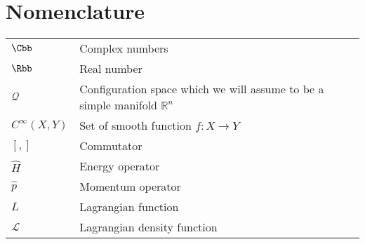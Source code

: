 \chapter*{Nomenclature}

\begin{flushleft}
\begin{longtable}[l]{ll}
    $\Cbb$ & Complex numbers \\[1mm]
    $\Rbb$ & Real number \\[1mm]
    $\mathcal{Q}$ & Configuration space which we will assume to be a simple manifold $\mathbb{R}^{n}$ \\[1mm]
    $C^{\infty}(X, Y)$ & Set of smooth function $f: X \to Y$ \\[1mm]
    $[,]$ & Commutator \\[1mm]
    $\hat{H}$ & Energy operator \\[1mm]
    $\hat{p}$ & Momentum operator \\[1mm]
    $L$ & Lagrangian function \\[1mm]
    $\mathcal{L}$ & Lagrangian density function \\[1mm]
\end{longtable}
\end{flushleft}
